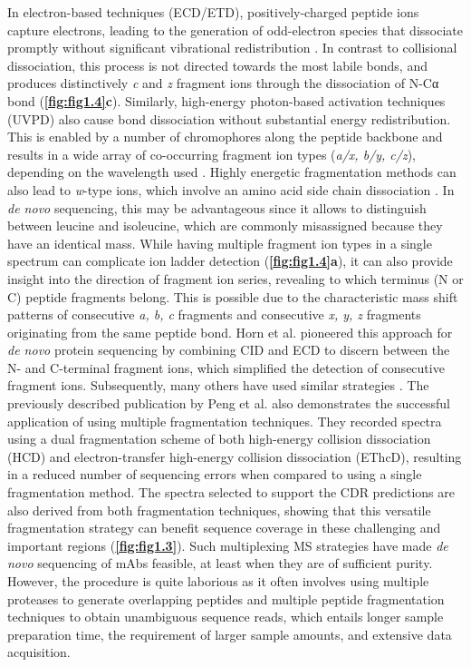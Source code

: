 In electron-based techniques (ECD/ETD), positively-charged peptide ions capture electrons, leading to the generation of odd-electron species that dissociate promptly without significant vibrational redistribution \cite{syka2004peptide, zubarev2000electron, mcluckey1998ion/ion}. In contrast to collisional dissociation, this process is not directed towards the most labile bonds, and produces distinctively \emph{c} and \emph{z} fragment ions through the dissociation of N-Cα bond (\textbf{\autoref{fig:fig1.4}c}). Similarly, high-energy photon-based activation techniques (UVPD) also cause bond dissociation without substantial energy redistribution. This is enabled by a number of chromophores along the peptide backbone and results in a wide array of co-occurring fragment ion types (\emph{a/x, b/y, c/z}), depending on the wavelength used \cite{brodbelt2016ion, brodbelt2020ultraviolet}. Highly energetic fragmentation methods can also lead to \emph{w}-type ions, which involve an amino acid side chain dissociation \cite{xiao2016distinguishing, kjeldsen2003distinguishing}. In \emph{de novo} sequencing, this may be advantageous since it allows to distinguish between leucine and isoleucine, which are commonly misassigned because they have an identical mass.
While having multiple fragment ion types in a single spectrum can complicate ion ladder detection (\textbf{\autoref{fig:fig1.4}a}), it can also provide insight into the direction of fragment ion series, revealing to which terminus (N or C) peptide fragments belong. This is possible due to the characteristic mass shift patterns of consecutive \emph{a, b, c} fragments and consecutive \emph{x, y, z} fragments originating from the same peptide bond. Horn et al. \cite{horn2000automated} pioneered this approach for \emph{de novo} protein sequencing by combining CID and ECD to discern between the N- and C-terminal fragment ions, which simplified the detection of consecutive fragment ions. Subsequently, many others have used similar strategies \cite{guthals2013sequencing-grade, vyatkina2017de, datta2009spectrum, horton2017comprehensive, bertsch2009de}.
The previously described publication by Peng et al. \cite{peng2021mass} also demonstrates the successful application of using multiple fragmentation techniques. They recorded spectra using a dual fragmentation scheme of both high-energy collision dissociation (HCD) and electron-transfer high-energy collision dissociation (EThcD), resulting in a reduced number of sequencing errors when compared to using a single fragmentation method. The spectra selected to support the CDR predictions are also derived from both fragmentation techniques, showing that this versatile fragmentation strategy can benefit sequence coverage in these challenging and important regions (\textbf{\autoref{fig:fig1.3}}).
Such multiplexing MS strategies have made \emph{de novo} sequencing of mAbs feasible, at least when they are of sufficient purity. However, the procedure is quite laborious as it often involves using multiple proteases to generate overlapping peptides and multiple peptide fragmentation techniques to obtain unambiguous sequence reads, which entails longer sample preparation time, the requirement of larger sample amounts, and extensive data acquisition.


